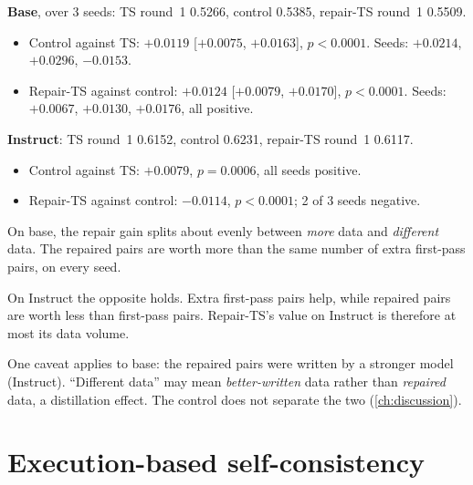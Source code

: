 \begin{observation}
\textbf{Base}, \Mviii{} over 3 seeds: TS round~1 0.5266, control 0.5385, repair-TS round~1 0.5509.
\begin{itemize}
\item Control against TS: $+0.0119$ [$+0.0075$, $+0.0163$], $p<0.0001$. Seeds: $+0.0214$, $+0.0296$, $-0.0153$.
\item Repair-TS against control: $+0.0124$ [$+0.0079$, $+0.0170$], $p<0.0001$. Seeds: $+0.0067$, $+0.0130$,
$+0.0176$, all positive.
\end{itemize}
\textbf{Instruct}: TS round~1 0.6152, control 0.6231, repair-TS round~1 0.6117.
\begin{itemize}
\item Control against TS: $+0.0079$, $p=0.0006$, all seeds positive.
\item Repair-TS against control: $-0.0114$, $p<0.0001$; 2 of 3 seeds negative.
\end{itemize}
\end{observation}

\begin{interpretation}
On base, the repair gain splits about evenly between \emph{more} data and \emph{different} data. The repaired pairs are
worth more than the same number of extra first-pass pairs, on every seed.

On Instruct the opposite holds. Extra first-pass pairs help, while repaired pairs are worth less than first-pass pairs.
Repair-TS's value on Instruct is therefore at most its data volume.

One caveat applies to base: the repaired pairs were written by a stronger model (Instruct). ``Different data'' may mean
\emph{better-written} data rather than \emph{repaired} data, a distillation effect. The control does not separate the
two (\cref{ch:discussion}).
\end{interpretation}

\section{Execution-based self-consistency}\label{sec:ext-sc}





